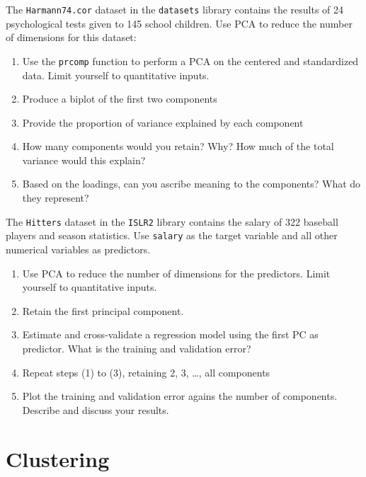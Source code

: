 \begin{exercisebox}

The \texttt{Harmann74.cor} dataset in the \texttt{datasets} library contains the results of 24 psychological tests given to 145 school children. 
Use PCA to reduce the number of dimensions for this dataset:
\begin{enumerate}
   \item Use the \texttt{prcomp} function to perform a PCA on the centered and standardized data. Limit yourself to quantitative inputs.
   \item Produce a biplot of the first two components
   \item Provide the proportion of variance explained by each component
   \item How many components would you retain? Why? How much of the total variance would this explain?
   \item Based on the loadings, can you ascribe meaning to the components? What do they represent?
\end{enumerate}
\end{exercisebox}

\begin{exercisebox}

The \texttt{Hitters} dataset in the \texttt{ISLR2} library contains the salary of 322 baseball players and season statistics. Use \texttt{salary} as the target variable and all other numerical variables as predictors. 

\begin{enumerate}
   \item Use PCA to reduce the number of dimensions for the predictors. Limit yourself to quantitative inputs.
   \item Retain the first principal component.
   \item Estimate and cross-validate a regression model using the first PC as predictor. What is the training and validation error?
   \item Repeat steps (1) to (3), retaining 2, 3, \ldots, all components
   \item Plot the training and validation error agains the number of components. Describe and discuss your results.
\end{enumerate}
\end{exercisebox}

\section{Clustering}

